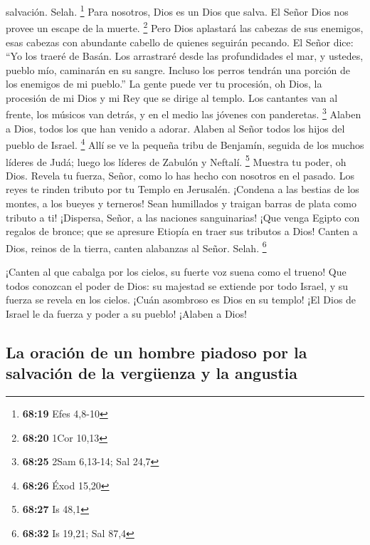 salvación. Selah. \footnote{\textbf{68:19} Efes 4,8-10} 
Para nosotros, Dios es un Dios que salva. El Señor Dios nos provee un
escape de la muerte. \footnote{\textbf{68:20} 1Cor 10,13} 
Pero Dios aplastará las cabezas de sus enemigos, esas cabezas con
abundante cabello de quienes seguirán pecando.  El Señor
dice: ``Yo los traeré de Basán. Los arrastraré desde las profundidades
el mar,  y ustedes, pueblo mío, caminarán en su sangre.
Incluso los perros tendrán una porción de los enemigos de mi pueblo.''
 La gente puede ver tu procesión, oh Dios, la procesión de
mi Dios y mi Rey que se dirige al templo.  Los cantantes
van al frente, los músicos van detrás, y en el medio las jóvenes con
panderetas. \footnote{\textbf{68:25} 2Sam 6,13-14; Sal 24,7}
 Alaben a Dios, todos los que han venido a adorar. Alaben
al Señor todos los hijos del pueblo de Israel. \footnote{\textbf{68:26}
  Éxod 15,20}  Allí se ve la pequeña tribu de Benjamín,
seguida de los muchos líderes de Judá; luego los líderes de Zabulón y
Neftalí. \footnote{\textbf{68:27} Is 48,1}  Muestra tu
poder, oh Dios. Revela tu fuerza, Señor, como lo has hecho con nosotros
en el pasado.  Los reyes te rinden tributo por tu Templo en
Jerusalén.  ¡Condena a las bestias de los montes, a los
bueyes y terneros! Sean humillados y traigan barras de plata como
tributo a ti! ¡Dispersa, Señor, a las naciones sanguinarias!
 ¡Que venga Egipto con regalos de bronce; que se apresure
Etiopía en traer sus tributos a Dios!  Canten a Dios,
reinos de la tierra, canten alabanzas al Señor. Selah. \footnote{\textbf{68:32}
  Is 19,21; Sal 87,4}

 ¡Canten al que cabalga por los cielos, su fuerte voz suena
como el trueno!  Que todos conozcan el poder de Dios: su
majestad se extiende por todo Israel, y su fuerza se revela en los
cielos.  ¡Cuán asombroso es Dios en su templo! ¡El Dios de
Israel le da fuerza y poder a su pueblo! ¡Alaben a Dios!

\hypertarget{la-oraciuxf3n-de-un-hombre-piadoso-por-la-salvaciuxf3n-de-la-verguxfcenza-y-la-angustia}{%
\subsection{La oración de un hombre piadoso por la salvación de la
vergüenza y la
angustia}\label{la-oraciuxf3n-de-un-hombre-piadoso-por-la-salvaciuxf3n-de-la-verguxfcenza-y-la-angustia}}

